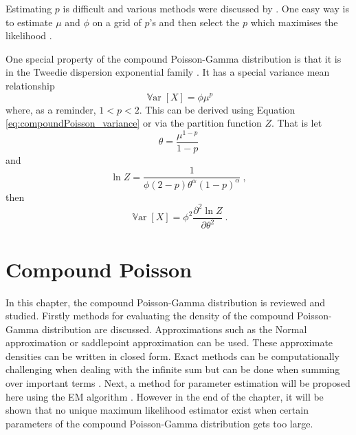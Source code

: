 \documentclass[12pt, a4paper]{memoir}
\DeclareMathOperator{\variance}{\mathbb{V}ar}
\begin{document}
Estimating $p$ is difficult and various methods were discussed by \cite{zhang2013likelihood}. One easy way is to estimate $\mu$ and $\phi$ on a grid of $p$'s and then select the $p$ which maximises the likelihood \citep{dunn2005series}.

One special property of the compound Poisson-Gamma distribution is that it is in the Tweedie dispersion exponential family \citep{jorgensen1987exponential}. It has a special variance mean relationship
\begin{equation}
\variance[X] = \phi \mu^p
\end{equation}
where, as a reminder, $1<p<2$. This can be derived using Equation \eqref{eq:compoundPoisson_variance} or via the partition function $Z$. That is let
\begin{equation}
\theta = \frac{\mu^{1-p}}{1-p}
\end{equation}
and
\begin{equation}
\ln Z = \frac{1}{\phi(2-p)\theta^\alpha(1-p)^\alpha} \ ,
\end{equation}
then
\begin{equation}
\variance[X] = \phi^2 \frac{\partial^2\ln Z}{\partial\theta^2} \ .
\end{equation}

\chapter{Compound Poisson}
In this chapter, the compound Poisson-Gamma distribution is reviewed and studied. Firstly methods for evaluating the density of the compound Poisson-Gamma distribution are discussed. Approximations such as the Normal approximation or saddlepoint approximation \citep{daniels1954saddlepoint} can be used. These approximate densities can be written in closed form. Exact methods can be computationally challenging when dealing with the infinite sum but can be done when summing over important terms \citep{dunn2005series}. Next, a method for parameter estimation will be proposed here using the EM algorithm \citep{dempster1977maximum}. However in the end of the chapter, it will be shown that no unique maximum likelihood estimator exist when certain parameters of the compound Poisson-Gamma distribution gets too large.
\end{document}
